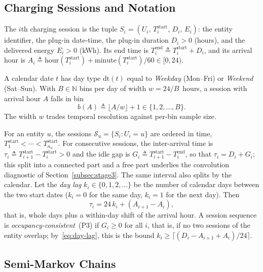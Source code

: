 \documentclass[journal]{IEEEtran}
\begin{document}
\subsection{Charging Sessions and Notation}
\label{subsec:session-random-object}
The $i$th charging session is the tuple $S_i = (U_i,\, T_i^{\mathrm{start}},\, D_i,\, E_i)$: the entity identifier, the plug-in date-time, the plug-in duration $D_i > 0$ (hours), and the delivered energy $E_i > 0$ (kWh). Its end time is $T_i^{\mathrm{end}} \triangleq T_i^{\mathrm{start}} + D_i$, and its arrival hour is $A_i \triangleq \mathrm{hour}(T_i^{\mathrm{start}}) + \mathrm{minute}(T_i^{\mathrm{start}})/60 \in [0, 24)$.

A calendar date $t$ has day type $\mathrm{dt}(t)$ equal to \emph{Weekday} (Mon--Fri) or \emph{Weekend} (Sat--Sun). With $B \in \mathbb{N}$ bins per day of width $w = 24/B$~hours, a session with arrival hour $A$ falls in bin
\begin{equation}
    b(A) \triangleq \lfloor A/w \rfloor + 1 \in \{1, 2, \ldots, B\}.
    \label{eq:bin-index}
\end{equation}
The width $w$ trades temporal resolution against per-bin sample size.

For an entity $u$, the sessions $\mathcal{S}_u = \{S_i : U_i = u\}$ are ordered in time, $T_1^{\mathrm{start}} < \cdots < T_{n_u}^{\mathrm{start}}$. For consecutive sessions, the inter-arrival time is $\tau_i \triangleq T_{i+1}^{\mathrm{start}} - T_i^{\mathrm{start}} > 0$ and the idle gap is $G_i \triangleq T_{i+1}^{\mathrm{start}} - T_i^{\mathrm{end}}$, so that $\tau_i = D_i + G_i$; this split into a connected part and a free part underlies the convolution diagnostic of Section~\ref{subsec:stage3}. The same interval also splits by the calendar. Let the \emph{day lag} $k_i \in \{0, 1, 2, \ldots\}$ be the number of calendar days between the two start dates ($k_i = 0$ for the same day, $k_i = 1$ for the next day). Then
\begin{equation}
    \tau_i = 24\,k_i + (A_{i+1} - A_i),
    \label{eq:day-lag}
\end{equation}
that is, whole days plus a within-day shift of the arrival hour. A session sequence is \emph{occupancy-consistent}~(P3) if $G_i \geq 0$ for all $i$, that is, if no two sessions of the entity overlap; by~\eqref{eq:day-lag}, this is the bound $k_i \geq \lceil (D_i - A_{i+1} + A_i)/24 \rceil$.

\subsection{Semi-Markov Chains}
\label{subsec:smc-formal-def}
\end{document}
